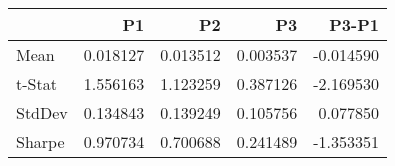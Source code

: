 \begin{tabular}{lrrrr}
\toprule
 & P1 & P2 & P3 & P3-P1 \\
\midrule
Mean & 0.018127 & 0.013512 & 0.003537 & -0.014590 \\
t-Stat & 1.556163 & 1.123259 & 0.387126 & -2.169530 \\
StdDev & 0.134843 & 0.139249 & 0.105756 & 0.077850 \\
Sharpe & 0.970734 & 0.700688 & 0.241489 & -1.353351 \\
\bottomrule
\end{tabular}
